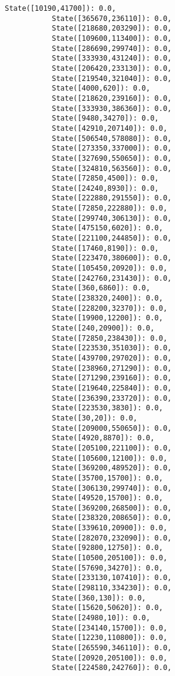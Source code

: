 \documentclass[11pt]{article}
\begin{document}
\begin{Verbatim}[commandchars=\\\{\}]
           State([10190,41700]): 0.0,
           State([365670,236110]): 0.0,
           State([218680,203290]): 0.0,
           State([109600,113400]): 0.0,
           State([286690,299740]): 0.0,
           State([333930,431240]): 0.0,
           State([206420,233130]): 0.0,
           State([219540,321040]): 0.0,
           State([4000,620]): 0.0,
           State([218620,239160]): 0.0,
           State([333930,386360]): 0.0,
           State([9480,34270]): 0.0,
           State([42910,207140]): 0.0,
           State([506540,578080]): 0.0,
           State([273350,337000]): 0.0,
           State([327690,550650]): 0.0,
           State([324810,563560]): 0.0,
           State([72850,4500]): 0.0,
           State([24240,8930]): 0.0,
           State([222880,291550]): 0.0,
           State([72850,222880]): 0.0,
           State([299740,306130]): 0.0,
           State([475150,6020]): 0.0,
           State([221100,244850]): 0.0,
           State([17460,8190]): 0.0,
           State([223470,380600]): 0.0,
           State([105450,20920]): 0.0,
           State([242760,231430]): 0.0,
           State([360,6860]): 0.0,
           State([238320,2400]): 0.0,
           State([228200,32370]): 0.0,
           State([19900,12200]): 0.0,
           State([240,20900]): 0.0,
           State([72850,238430]): 0.0,
           State([223530,351030]): 0.0,
           State([439700,297020]): 0.0,
           State([238960,271290]): 0.0,
           State([271290,239160]): 0.0,
           State([219640,225840]): 0.0,
           State([236390,233720]): 0.0,
           State([223530,3830]): 0.0,
           State([30,20]): 0.0,
           State([209000,550650]): 0.0,
           State([4920,8870]): 0.0,
           State([205100,221100]): 0.0,
           State([105600,12100]): 0.0,
           State([369200,489520]): 0.0,
           State([35700,15700]): 0.0,
           State([306130,299740]): 0.0,
           State([49520,15700]): 0.0,
           State([369200,268500]): 0.0,
           State([238320,208650]): 0.0,
           State([339610,20900]): 0.0,
           State([282070,232090]): 0.0,
           State([92800,12750]): 0.0,
           State([10500,205100]): 0.0,
           State([57690,34270]): 0.0,
           State([233130,107410]): 0.0,
           State([298110,334230]): 0.0,
           State([360,130]): 0.0,
           State([15620,50620]): 0.0,
           State([24980,10]): 0.0,
           State([234140,15700]): 0.0,
           State([12230,110800]): 0.0,
           State([265590,346110]): 0.0,
           State([20920,205100]): 0.0,
           State([224580,242760]): 0.0,

\end{Verbatim}
\end{document}
